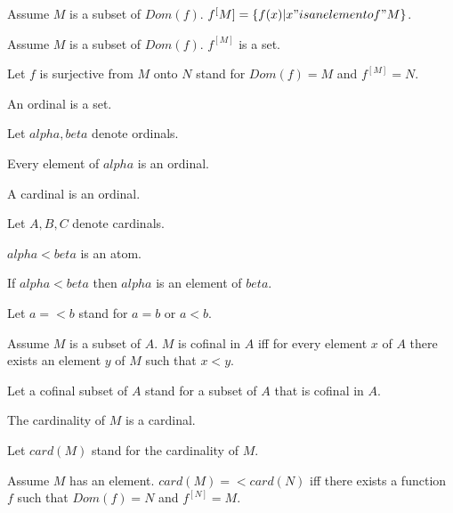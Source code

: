 \documentclass{article}
\begin{document}
\begin{forthel}
    \begin{definition}
      Assume $M$ is a subset of $Dom(f)$. $f^[M] = \{f(x) | x "is an element of" M\}$.
    \end{definition}

    \begin{axiom}
      Assume $M$ is a subset of $Dom(f)$. $f^[M]$ is a set.
    \end{axiom}

    Let $f$ is surjective from $M$ onto $N$ stand for $Dom(f) = M$ and $f^[M] = N$.

    \begin{signature}
      An ordinal is a set.
    \end{signature}

    Let $alpha, beta$ denote ordinals.

    \begin{axiom}
      Every element of $alpha$ is an ordinal.
    \end{axiom}

    \begin{signature}
      A cardinal is an ordinal.
    \end{signature}

    Let $A,B,C$ denote cardinals.

    \begin{signature}
      $alpha < beta$ is an atom.
    \end{signature}

    \begin{axiom}
      If $alpha < beta$ then $alpha$ is an element of $beta$.
    \end{axiom}

    Let $a =< b$ stand for $a = b$ or $a < b$.

    \begin{definition}
      Assume $M$ is a subset of $A$. $M$ is cofinal in $A$ iff for every element $x$ of $A$ there exists an element $y$ of $M$ such that $x < y$.
    \end{definition}

    Let a cofinal subset of $A$ stand for a subset of $A$ that is cofinal in $A$.

    \begin{signature}
      The cardinality of $M$ is a cardinal.
    \end{signature}

    Let $card(M)$ stand for the cardinality of $M$.

    \begin{axiom}[SurjExi]
      Assume $M$ has an element. $card(M) =< card(N)$ iff there exists a function $f$ such that $Dom(f) = N$ and $f^[N] = M$.
    \end{axiom}


\end{forthel}
\end{document}

